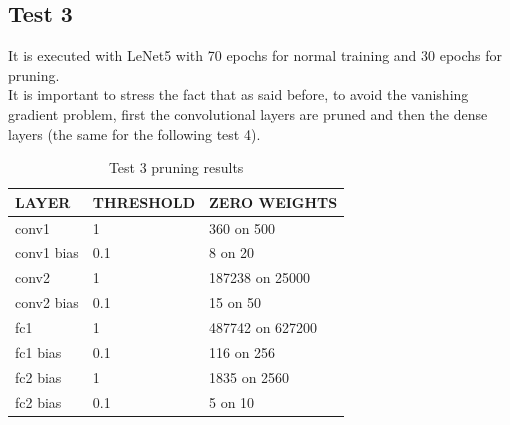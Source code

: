 \documentclass[journal]{vgtc}                %
\begin{document}
\subsection{Test 3}
It is executed with LeNet5 with 70 epochs for normal training and 30 epochs for pruning.\\It is important to stress the fact that as said before, to avoid the vanishing gradient problem, first the convolutional layers are pruned and then the dense layers (the same for the following test 4).
\begin{table}[H]
\caption{Test 3 pruning results}
\label{my-label}
\begin{tabular}{|l|l|l|}
\hline
LAYER    & THRESHOLD & ZERO WEIGHTS     \\ \hline
conv1      & 1         & 360 on 500 \\ \hline
conv1 bias & 0.1       & 8 on 20        \\ \hline
conv2      & 1         & 187238 on 25000   \\ \hline
conv2 bias & 0.1       & 15 on 50       \\ \hline
fc1      & 1       & 487742 on 627200      \\ \hline
fc1 bias & 0.1         & 116 on 256          \\ \hline
fc2 bias & 1         & 1835 on 2560          \\ \hline
fc2 bias & 0.1        & 5 on 10          \\ \hline

\end{tabular}
\end{table}
\end{document}
